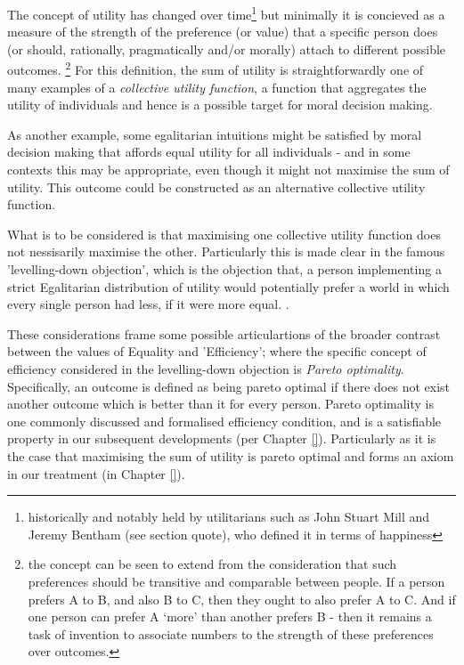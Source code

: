 The concept of utility has changed over time\footnote{historically and notably held by utilitarians such as John Stuart Mill\cite{MillGutenberg} and Jeremy Bentham (see section quote), who defined it in terms of happiness}
but minimally it is concieved as a measure of the strength of the preference (or value) that a specific person does (or should, rationally, pragmatically and/or morally) attach to different possible outcomes.%
\footnote{the concept can be seen to extend from the consideration that such preferences should be transitive and comparable between people. If a person prefers A to B, and also B to C, then they ought to also prefer A to C. And if one person can prefer A `more' than another prefers B - then it remains a task of invention to associate numbers to the strength of these preferences over outcomes.}
For this definition, the sum of utility is straightforwardly one of many examples of a \textit{collective utility function}, a function that aggregates the utility of individuals and hence is a possible target for moral decision making.\cite{TheoriesofValueAggregation}

As another example, some egalitarian intuitions might be satisfied by moral decision making that affords equal utility for all individuals - and in some contexts this may be appropriate, even though it might not maximise the sum of utility. This outcome could be constructed as an alternative collective utility function.

What is to be considered is that maximising one collective utility function does not nessisarily maximise the other.
Particularly this is made clear in the famous 'levelling-down objection', which is the objection that, a person implementing a strict Egalitarian distribution of utility would potentially prefer a world in which every single person had less, if it were more equal. \cite{temkin_2003, equalityandpriorityparfit}.

These considerations frame some possible articulartions of the broader contrast between the values of Equality and 'Efficiency'; where the specific concept of efficiency considered in the levelling-down objection is \textit{Pareto optimality}.
Specifically, an outcome is defined as being pareto optimal if there does not exist another outcome which is better than it for every person.
Pareto optimality is one commonly discussed and formalised efficiency condition, and is a satisfiable property in our subsequent developments (per Chapter \ref{}).
Particularly as it is the case that maximising the sum of utility is pareto optimal \cite{TheoriesofValueAggregation} and forms an axiom in our treatment (in Chapter \ref{}).


